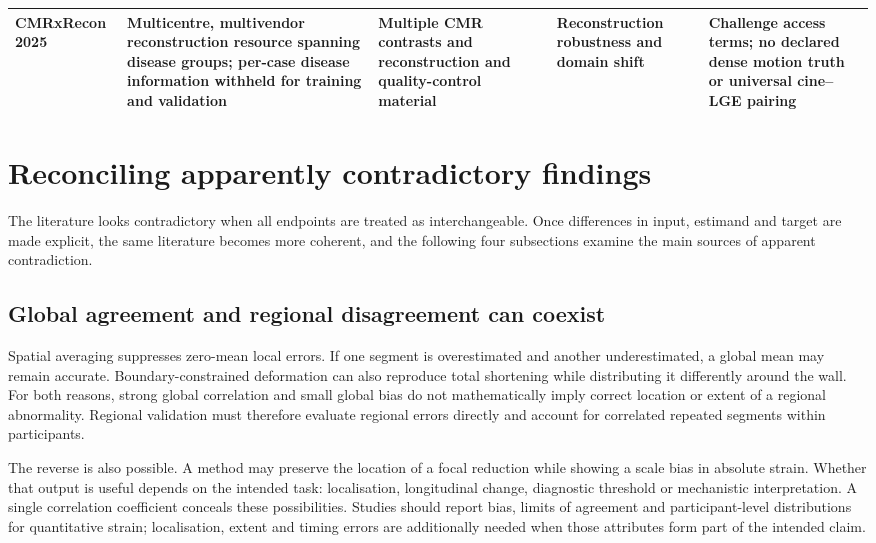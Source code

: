 {\begin{longtable}{L{0.139\textwidth}L{0.162\textwidth}L{0.208\textwidth}L{0.185\textwidth}L{0.231\textwidth}}
\addlinespace
CMRxRecon 2025~\cite{cmrxrecon2025official} & Multicentre, multivendor reconstruction resource spanning disease groups; per-case disease information withheld for training and validation & Multiple CMR contrasts and reconstruction and quality-control material & Reconstruction robustness and domain shift & Challenge access terms; no declared dense motion truth or universal cine--LGE pairing \\
\bottomrule
\end{longtable}
}

\section{Reconciling apparently contradictory findings}\label{sec:reconcile}

The literature looks contradictory when all endpoints are treated as interchangeable. Once differences in input, estimand and target are made explicit, the same literature becomes more coherent, and the following four subsections examine the main sources of apparent contradiction.

\subsection{Global agreement and regional disagreement can coexist}

Spatial averaging suppresses zero-mean local errors. If one segment is overestimated and another underestimated, a global mean may remain accurate. Boundary-constrained deformation can also reproduce total shortening while distributing it differently around the wall. For both reasons, strong global correlation and small global bias do not mathematically imply correct location or extent of a regional abnormality. Regional validation must therefore evaluate regional errors directly and account for correlated repeated segments within participants.

The reverse is also possible. A method may preserve the location of a focal reduction while showing a scale bias in absolute strain. Whether that output is useful depends on the intended task: localisation, longitudinal change, diagnostic threshold or mechanistic interpretation. A single correlation coefficient conceals these possibilities. Studies should report bias, limits of agreement and participant-level distributions for quantitative strain; localisation, extent and timing errors are additionally needed when those attributes form part of the intended claim.

